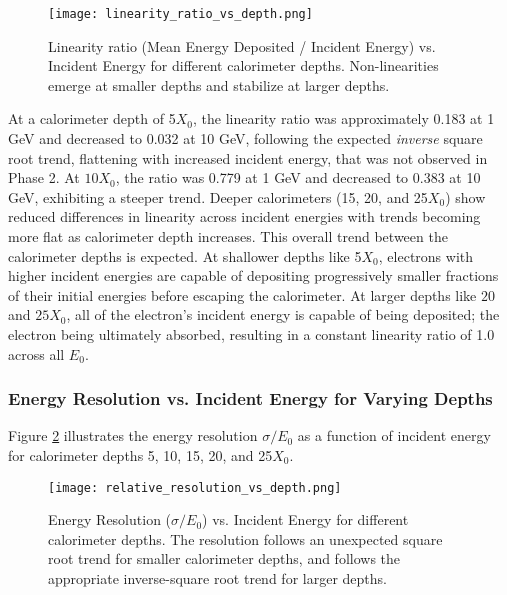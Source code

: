 \documentclass[twocolumn]{aastex631}
\begin{document}
\begin{figure}[htp]
  \centering
    \texttt{[image: linearity\_ratio\_vs\_depth.png]}
    \caption{Linearity ratio (Mean Energy Deposited / Incident Energy) vs.
    Incident Energy for different calorimeter depths. Non-linearities emerge at
smaller depths and stabilize at larger depths.}
\label{fig:e_2}
\end{figure}

At a calorimeter depth of 5$X_0$, the linearity  ratio was approximately 0.183 at 1 GeV and
decreased to 0.032 at 10 GeV, following the expected \textit{inverse} square
root trend, flattening with increased incident energy, that was not observed in
Phase 2. At $10X_0$, the ratio was 0.779 at 1 GeV and decreased to 0.383 at 10
GeV, exhibiting a steeper trend. Deeper calorimeters (15, 20, and 25$X_0$) show
reduced differences in linearity across incident energies with trends becoming
more flat as calorimeter depth increases. This overall trend between the
calorimeter depths is expected. At shallower depths like 5$X_0$, electrons
with higher incident energies are capable of depositing progressively smaller fractions of their
initial energies before escaping the calorimeter. At larger depths like $20$ and
 $25X_0$, all of the electron's incident energy is capable of being deposited;
 the electron being ultimately absorbed, resulting in a constant linearity ratio
 of 1.0 across all $E_0$. 

 \subsubsection{Energy Resolution vs. Incident Energy for Varying Depths}

 Figure \ref{fig:e_3} illustrates the energy resolution $\sigma / E_0$ as a function of
 incident energy for calorimeter depths 5, 10, 15, 20, and 25$X_0$. 

 \begin{figure}[htp]
   \centering
     \texttt{[image: relative\_resolution\_vs\_depth.png]}
     \caption{Energy Resolution ($\sigma/E_0$) vs. Incident Energy for different
         calorimeter depths. The resolution follows an unexpected square root
         trend for smaller
         calorimeter depths, and follows the appropriate inverse-square root trend for
     larger depths.}
         \label{fig:e_3} 
 \end{figure}
\end{document}
